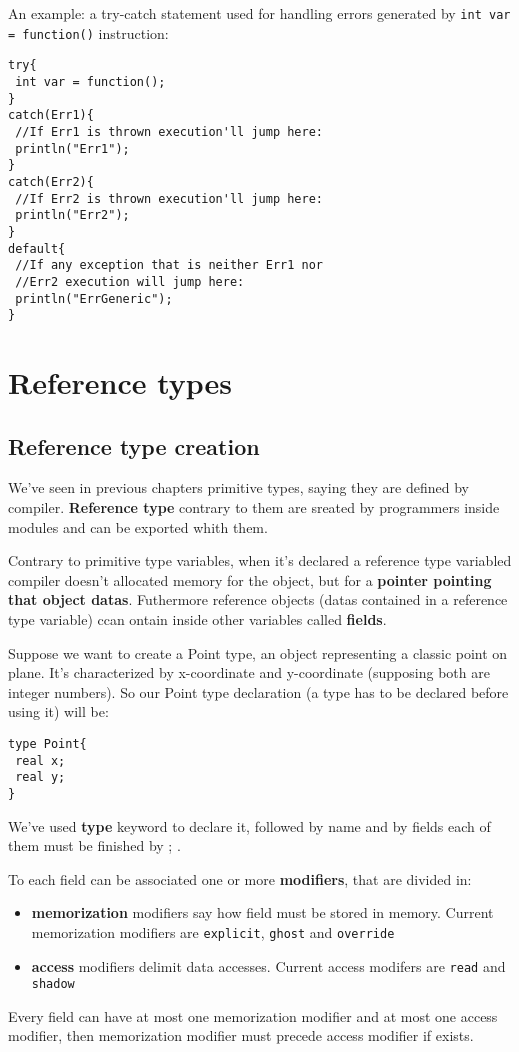 \documentclass[10pt]{book}%
\newcommand{\code}[1]{\texttt{#1}}
\renewcommand{\emph}[1]{\textbf{#1}}
\newenvironment{codeenv}{
\begin{mdframed}[backgroundcolor=black!20,topline=false,leftline=false,rightline=false,bottomline=false]
}
{\end{mdframed}}
\begin{document}
An example: a try-catch statement used for handling errors generated by \code{int var = function()} instruction:

\begin{codeenv}
\begin{verbatim}
try{
 int var = function();
}
catch(Err1){
 //If Err1 is thrown execution'll jump here:
 println("Err1");
}
catch(Err2){
 //If Err2 is thrown execution'll jump here:
 println("Err2");
}
default{
 //If any exception that is neither Err1 nor 
 //Err2 execution will jump here:
 println("ErrGeneric");
}
\end{verbatim}
\end{codeenv}


\chapter{Reference types}
\section{Reference type creation}
We've seen in previous chapters primitive types, saying they are defined by compiler. \emph{Reference type} contrary to them are sreated by programmers inside modules and can be exported whith them.

Contrary to primitive type variables, when it's declared a reference type variabled compiler doesn't allocated memory for the object, but for a \emph{pointer pointing that object datas}. Futhermore reference objects (datas contained in a reference type variable) ccan ontain inside other variables called \emph{fields}.

Suppose we want to create a Point type, an object representing a classic point on plane. It's characterized by x-coordinate and y-coordinate (supposing both are integer numbers). So our Point type declaration (a type has to be declared before using it) will be:
\begin{codeenv}
\begin{verbatim}
type Point{
 real x;
 real y;
}
\end{verbatim}
\end{codeenv}
We've used \emph{type} keyword to declare it, followed by name and by fields each of them must be finished by ; .

To each field can be associated one or more \emph{modifiers}, that are divided in:
\begin{itemize}
\item \emph{memorization} modifiers say how field must be stored in memory. Current memorization modifiers are \code{explicit}, \code{ghost} and \code{override}
\item \emph{access} modifiers delimit data accesses. Current access modifers are \code{read} and \code{shadow}
\end{itemize}
Every field can have at most one memorization modifier and at most one access modifier, then memorization modifier must precede access modifier if exists.
\end{document}

